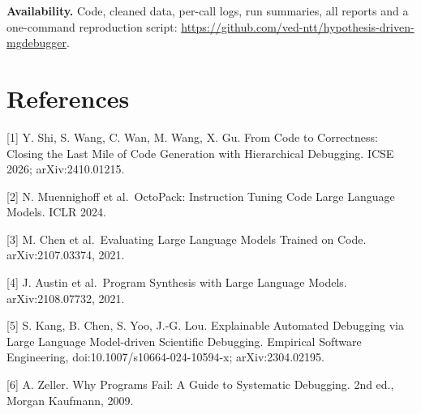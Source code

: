 \documentclass[
  10pt,
  twocolumn]{article}
\begin{document}
\textbf{Availability.} Code, cleaned data, per-call logs, run summaries,
all reports and a one-command reproduction script:
\url{https://github.com/ved-ntt/hypothesis-driven-mgdebugger}.

\hypertarget{references}{%
\section{References}\label{references}}

\small

{[}1{]} Y. Shi, S. Wang, C. Wan, M. Wang, X. Gu. From Code to
Correctness: Closing the Last Mile of Code Generation with Hierarchical
Debugging. ICSE 2026; arXiv:2410.01215.

{[}2{]} N. Muennighoff et al.~OctoPack: Instruction Tuning Code Large
Language Models. ICLR 2024.

{[}3{]} M. Chen et al.~Evaluating Large Language Models Trained on Code.
arXiv:2107.03374, 2021.

{[}4{]} J. Austin et al.~Program Synthesis with Large Language Models.
arXiv:2108.07732, 2021.

{[}5{]} S. Kang, B. Chen, S. Yoo, J.-G. Lou. Explainable Automated
Debugging via Large Language Model-driven Scientific Debugging.
Empirical Software Engineering, doi:10.1007/s10664-024-10594-x;
arXiv:2304.02195.

{[}6{]} A. Zeller. Why Programs Fail: A Guide to Systematic Debugging.
2nd ed., Morgan Kaufmann, 2009.
\end{document}
